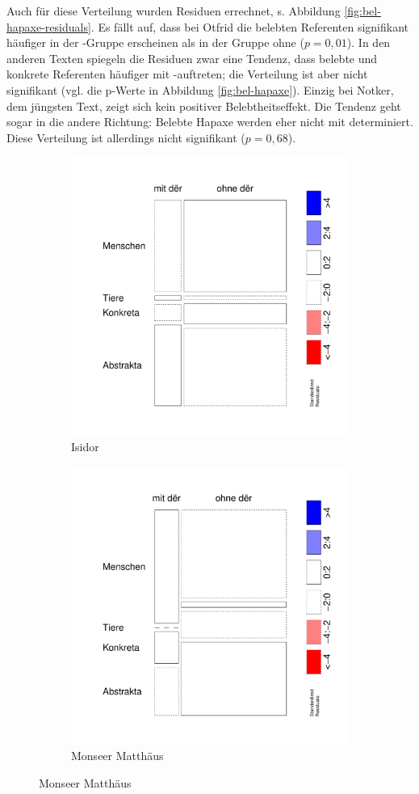 Auch für diese Verteilung wurden Residuen errechnet, s. Abbildung  \ref{fig:bel-hapaxe-residuals}. Es fällt auf, dass bei Otfrid die belebten Referenten signifikant häufiger in der -Gruppe erscheinen als in der Gruppe ohne  ($p = 0,01$). In den anderen Texten spiegeln die Residuen zwar eine Tendenz, dass belebte und konkrete Referenten häufiger mit -auftreten; die Verteilung ist aber nicht signifikant (vgl. die p-Werte in Abbildung \ref{fig:bel-hapaxe}). Einzig bei Notker, dem jüngsten Text, zeigt sich kein positiver Belebtheitseffekt. Die Tendenz geht sogar in die andere Richtung: Belebte Hapaxe werden eher nicht mit  determiniert. Diese Verteilung ist allerdings nicht signifikant ($p = 0,68$).  

\begin{figure}
\begin{subfigure}[b]{.5\linewidth}
  \includegraphics[width=6 cm]{generated/images/residuals-bel-I}
\caption {Isidor}
\end{subfigure}%
\begin{subfigure}[b]{.5\linewidth}
  \includegraphics[width=6 cm]{generated/images/residuals-bel-M}
\caption {Monseer Matthäus}
\end{subfigure}


\end{figure}
